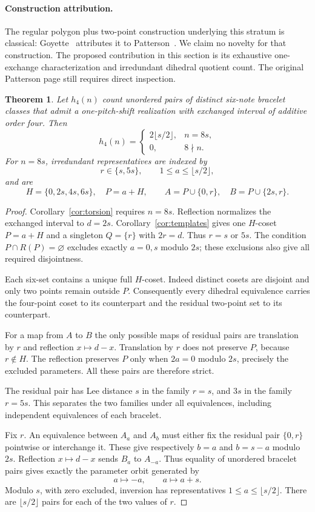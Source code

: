 \documentclass[11pt]{article}
\newtheorem{theorem}{Theorem}
\begin{document}
\paragraph{Construction attribution.} The regular polygon plus two-point construction underlying this stratum is classical: Goyette~\cite[pp.~75--76]{Goyette} attributes it to Patterson~\cite[p.~199]{Patterson}. We claim no novelty for that construction. The proposed contribution in this section is its exhaustive one-exchange characterization and irredundant dihedral quotient count. The original Patterson page still requires direct inspection.
\begin{theorem}\label{thm:four}
Let $h_4(n)$ count unordered pairs of distinct six-note bracelet classes that admit a one-pitch-shift realization with exchanged interval of additive order four. Then
\[
 h_4(n)=\begin{cases}
 2\lfloor s/2\rfloor,&n=8s,\\
 0,&8\nmid n.
 \end{cases}
\]
For $n=8s$, irredundant representatives are indexed by
\[
 r\in\{s,5s\},\qquad 1\le a\le\lfloor s/2\rfloor,
\]
and are
\[
 H=\{0,2s,4s,6s\},\quad P=a+H,\qquad
 A=P\cup\{0,r\},\quad B=P\cup\{2s,r\}.
\]
\end{theorem}
\begin{proof}
Corollary~\ref{cor:torsion} requires $n=8s$. Reflection normalizes the exchanged interval to $d=2s$. Corollary~\ref{cor:templates} gives one $H$-coset $P=a+H$ and a singleton $Q=\{r\}$ with $2r=d$. Thus $r=s$ or $5s$. The condition $P\cap R(P)=\varnothing$ excludes exactly $a=0,s$ modulo $2s$; these exclusions also give all required disjointness.

Each six-set contains a unique full $H$-coset. Indeed distinct cosets are disjoint and only two points remain outside $P$. Consequently every dihedral equivalence carries the four-point coset to its counterpart and the residual two-point set to its counterpart.

For a map from $A$ to $B$ the only possible maps of residual pairs are translation by $r$ and reflection $x\mapsto d-x$. Translation by $r$ does not preserve $P$, because $r\notin H$. The reflection preserves $P$ only when $2a=0$ modulo $2s$, precisely the excluded parameters. All these pairs are therefore strict.

The residual pair has Lee distance $s$ in the family $r=s$, and $3s$ in the family $r=5s$. This separates the two families under all equivalences, including independent equivalences of each bracelet.

Fix $r$. An equivalence between $A_a$ and $A_b$ must either fix the residual pair $\{0,r\}$ pointwise or interchange it. These give respectively $b=a$ and $b=s-a$ modulo $2s$. Reflection $x\mapsto d-x$ sends $B_a$ to $A_{-a}$. Thus equality of unordered bracelet pairs gives exactly the parameter orbit generated by
\[
 a\longmapsto-a,\qquad a\longmapsto a+s.
\]
Modulo $s$, with zero excluded, inversion has representatives $1\le a\le\lfloor s/2\rfloor$. There are $\lfloor s/2\rfloor$ pairs for each of the two values of $r$.
\end{proof}
\end{document}
